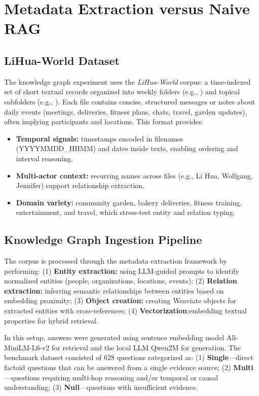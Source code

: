 \section{Metadata Extraction versus Naive RAG}
\subsection{LiHua-World Dataset}
\label{subsec:LiHua-World}
The knowledge graph experiment uses the \emph{LiHua-World} corpus: a time-indexed set of short textual records organized into weekly folders (e.g., ) and topical subfolders (e.g., ). Each file contains concise, structured messages or notes about daily events (meetings, deliveries, fitness plans, chats, travel, garden updates), often implying participants and locations. This format provides:
\begin{itemize}
    \item \textbf{Temporal signals:} timestamps encoded in filenames (YYYYMMDD\_HHMM) and dates inside texts, enabling ordering and interval reasoning.
    \item \textbf{Multi-actor context:} recurring names across files (e.g., Li Hua, Wolfgang, Jennifer) support relationship extraction.
    \item \textbf{Domain variety:} community garden, bakery deliveries, fitness training, entertainment, and travel, which stress-test entity and relation typing.
\end{itemize}

\subsection{Knowledge Graph Ingestion Pipeline}

The corpus is processed through the metadata extraction framework by performing: (1) \textbf{Entity extraction:} using LLM-guided prompts to identify normalized entities (people, organizations, locations, events); (2) \textbf{Relation extraction:} inferring semantic relationships between entities based on embedding proximity; (3) \textbf{Object creation:} creating  Weaviate objects for extracted entities with cross-references; (4) \textbf{Vectorization}:embedding textual properties for hybrid retrieval.


In this setup, answers were generated using sentence embedding model All-MiniLM-L6-v2 for retrieval and the local LLM Qwen2M for generation. The benchmark dataset consisted of 628 questions categorized as: (1) \textbf{Single}—direct factoid questions that can be answered from a single evidence source; (2) \textbf{Multi}—questions requiring multi-hop reasoning and/or temporal or causal understanding; (3) \textbf{Null}—questions with insufficient evidence.


